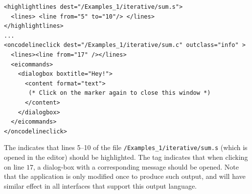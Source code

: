 \medskip
\begin{lstlisting}
<highlightlines dest="/Examples_1/iterative/sum.s"> 
  <lines> <line from="5" to="10"/> </lines>
</highlightlines>
...
<oncodelineclick dest="/Examples_1/iterative/sum.c" outclass="info" >
  <lines><line from="17" /></lines>
  <eicommands>
    <dialogbox boxtitle="Hey!"> 
      <content format="text">
       (* Click on the marker again to close this window *)
      </content>
    </dialogbox>
  </eicommands>
</oncodelineclick>

\end{lstlisting}

\medskip
\noindent
The  indicates that lines 5--10 of the file
\texttt{/Examples\_1/iterative/sum.s} (which is opened in the editor)
should be highlighted. The  tag indicates that
when clicking on line $17$, a dialog-box with a corresponding message
should be opened.
%
Note that the application is only modified once to produce such
output, and will have similar effect in all interfaces that support
this output language.

